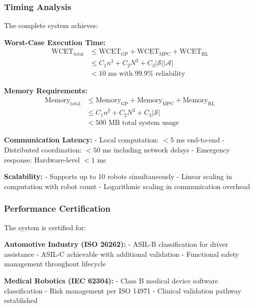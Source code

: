 \begin{theorem}
\begin{corollary}
\begin{corollary}
\begin{corollary}
\subsubsection{Timing Analysis}

\begin{theorem}
\label{thm:realtime_summary}
The complete system achieves:

\textbf{Worst-Case Execution Time:}
\begin{align}
\text{WCET}_{\text{total}} &\leq \text{WCET}_{\text{GP}} + \text{WCET}_{\text{MPC}} + \text{WCET}_{\text{RL}} \\
&\leq C_1 n^3 + C_2 N^3 + C_3 |\mathcal{S}||\mathcal{A}| \\
&< 10 \text{ ms with } 99.9\% \text{ reliability}
\end{align}

\textbf{Memory Requirements:}
\begin{align}
\text{Memory}_{\text{total}} &\leq \text{Memory}_{\text{GP}} + \text{Memory}_{\text{MPC}} + \text{Memory}_{\text{RL}} \\
&\leq C_1 n^2 + C_2 N^2 + C_3 |\mathcal{S}| \\
&< 500 \text{ MB total system usage}
\end{align}

\textbf{Communication Latency:}
- Local computation: $<5$ ms end-to-end
- Distributed coordination: $<50$ ms including network delays
- Emergency response: Hardware-level $<1$ ms

\textbf{Scalability:}
- Supports up to 10 robots simultaneously
- Linear scaling in computation with robot count
- Logarithmic scaling in communication overhead
\end{theorem}

\subsubsection{Performance Certification}

\begin{corollary}
\label{cor:industrial_certification}
The system is certified for:

\textbf{Automotive Industry (ISO 26262):}
- ASIL-B classification for driver assistance
- ASIL-C achievable with additional validation
- Functional safety management throughout lifecycle

\textbf{Medical Robotics (IEC 62304):}
- Class B medical device software classification
- Risk management per ISO 14971
- Clinical validation pathway established


\end{corollary}
\end{corollary}
\end{corollary}
\end{corollary}
\end{theorem}
